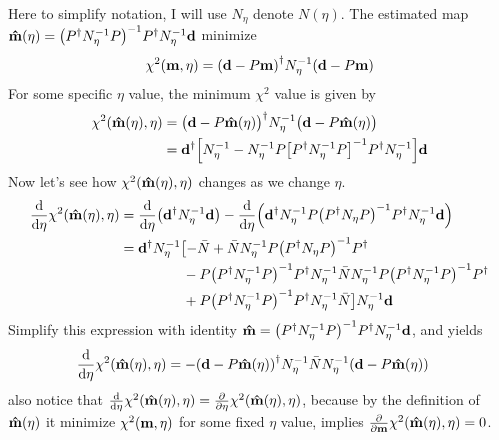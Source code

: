 \documentclass[11pt, letterpaper]{article}
\newcommand{\vbd}{\vb{d}}
\newcommand{\vbm}{\vb{m}}
\newcommand{\inv}[1]{#1^{-1}}
\newcommand{\hatm}{\vb{\hat{m}}}
\newcommand{\Pdagger}{P^{\dagger}}
\newcommand{\Nbar}{\bar{N}}
\newcommand{\PPinv}[1]{\inv{\qty(\Pdagger #1 P)}}
\newcommand{\Neta}{N_{\eta}}
\begin{document}
Here to simplify notation, I will use $\Neta$ denote $N(\eta)$.
The estimated map
$\hatm(\eta) = \PPinv{\inv{\Neta}} \Pdagger \inv{\Neta} \vbd$
minimize
\begin{align}
\chi^2 (\vbm, \eta)
= \qty(\vbd - P \vbm)^{\dagger} \inv{\Neta} (\vbd - P\vbm)
\label{chi2 eta formula}
\end{align}
For some specific $\eta$ value, the minimum $\chi^2$ value is given by
\begin{align}
\begin{aligned}[b]
\chi^2 (\hatm(\eta), \eta)
&= \qty\big(\vbd - P \hatm(\eta))^{\dagger} \inv{\Neta} 
    \qty\big(\vbd - P\hatm(\eta))
\\
& = \vbd^{\dagger} \qty[\inv{\Neta}
    - \inv{\Neta}P\inv{\qty[
        \Pdagger \inv{\Neta} P
    ]}\Pdagger\inv{\Neta}]\vbd
\end{aligned}
\end{align}
Now let's see how $\chi^2(\hatm(\eta),\eta)$ changes as we change $\eta$.
\begin{align}
\begin{aligned}[b]
\dv{\eta} \chi^2(\hatm(\eta),\eta) 
&= \dv{\eta}(\vbd^{\dagger}\inv{\Neta}\vbd)
    - \dv{\eta}(
        \vbd^{\dagger}\inv{\Neta}P 
        \PPinv{\Neta} 
        \Pdagger \inv{\Neta} \vbd
    )
\\
&= \vbd^{\dagger} \inv{\Neta} \bigl[
    - \Nbar
    + \Nbar \inv{\Neta}P\PPinv{\Neta}\Pdagger
    \\
    &\phantom{= \vbd^{\dagger} \inv{\Neta} \bigl[}
    -P\PPinv{\inv{\Neta}} \Pdagger \inv{\Neta} \Nbar \inv{\Neta}
        P \PPinv{\inv{\Neta}}\Pdagger
    \\
    &\phantom{= \vbd^{\dagger} \inv{N_{\eta}} \bigl[}
    + P \PPinv{\inv{\Neta}} \Pdagger \inv{\Neta} \Nbar
    \big] \inv{\Neta} \vbd
\end{aligned}
\end{align}
Simplify this expression with identity
$\hatm = \PPinv{\inv{\Neta}} \Pdagger \inv{\Neta}\vbd$, and yields
\begin{align}
\dv{\eta} \chi^2(\hatm(\eta), \eta) 
&= - \qty(\vbd - P\hatm(\eta))^{\dagger} \inv{\Neta} \Nbar \inv{\Neta} 
    (\vbd - P\hatm(\eta)) \label{d chi2}
\end{align}
also notice that
$\dv{\eta} \chi^2(\hatm(\eta), \eta) = \pdv{\eta} \chi^2(\hatm(\eta), \eta)$,
because by the definition of $\hatm(\eta)$ it minimize
$\chi^2(\vbm, \eta)$ for some fixed $\eta$ value,
implies $\pdv{\vbm} \chi^2(\hatm(\eta), \eta) = 0$.
\end{document}
